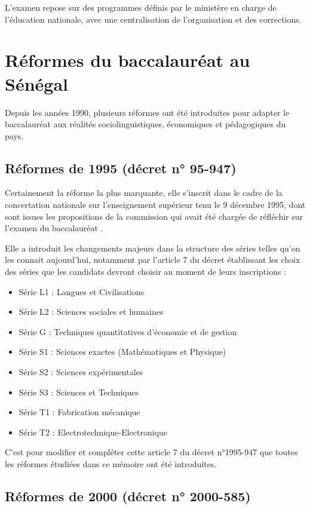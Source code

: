 L’examen repose sur des programmes définis par le ministère en charge de l’éducation nationale, avec une centralisation de l’organisation et des corrections.

\section{Réformes du baccalauréat au Sénégal}

Depuis les années 1990, plusieurs réformes ont été introduites pour adapter le baccalauréat aux réalités sociolinguistiques, 
économiques et pédagogiques du pays.

\subsection{Réformes de 1995 (décret n° 95-947)}

Certainement la réforme la plus marquante, elle s'inscrit dans le cadre de la concertation nationale sur l'enseignement supérieur tenu le 9 décembre 1995, 
dont sont issues les propositions de la commission qui avait été chargée de réfléchir sur l'examen du baccalauréat \cite{decret95}.

Elle a introduit les changements majeurs dans la structure des séries telles qu'on les connait aujourd'hui, 
notamment par l'article 7 du décret établissant les choix des séries que les candidats devront choisir au moment de leurs inscriptions :

\begin{itemize}
    \item Série L1 : Langues et Civilisations
    \item Série L2 : Sciences sociales et humaines
    \item Série G : Techniques quantitatives d'économie et de gestion
    \item Série S1 : Sciences exactes (Mathématiques et Physique)
    \item Série S2 : Sciences expérimentales
    \item Série S3 : Sciences et Techniques
    \item Série T1 : Fabrication mécanique
    \item Série T2 : Electrotechnique-Electronique
\end{itemize}

C'est pour modifier et compléter cette article 7 du décret n°1995-947 que toutes les réformes étudiées dans ce mémoire ont été introduites.

\subsection{Réformes de 2000 (décret n° 2000-585)}

